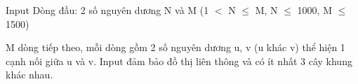 Input
Dòng đầu: 2 số nguyên dương N và M (1 $<$ N  $\le$  M, N  $\le$  1000, M  $\le$  1500)


M dòng tiếp theo, mỗi dòng gồm 2 số nguyên dương u, v (u khác v) thể hiện 1 cạnh nối giữa u và v. Input đảm bảo đồ thị liên thông và có ít nhất 3 cây khung khác nhau.